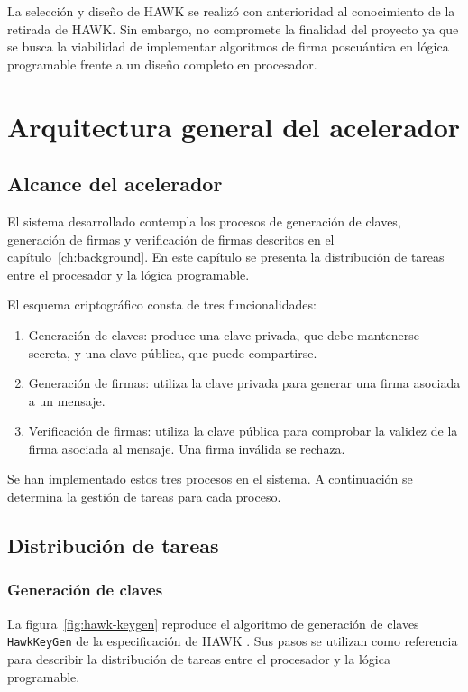 La selección y diseño de HAWK se realizó con anterioridad al conocimiento de la retirada de HAWK.
Sin embargo, no compromete la finalidad del proyecto ya que se busca la viabilidad de implementar
algoritmos de firma poscuántica en lógica programable frente a un diseño completo en procesador.

\section{Arquitectura general del acelerador}
\label{sec:arquitectura-acelerador}

\subsection{Alcance del acelerador}

El sistema desarrollado contempla los procesos de generación
de claves, generación de firmas y verificación de firmas
descritos en el capítulo~\ref{ch:background}.
En este capítulo se presenta la distribución de tareas
entre el procesador y la lógica programable.

El esquema criptográfico consta de tres funcionalidades:
\begin{enumerate}
    \item Generación de claves: produce una clave privada,
    que debe mantenerse secreta, y una clave pública, que puede compartirse.
    \item Generación de firmas: utiliza la clave privada
    para generar una firma asociada a un mensaje.
    \item Verificación de firmas: utiliza la clave pública
    para comprobar la validez de la firma asociada al mensaje.
    Una firma inválida se rechaza.
\end{enumerate}
Se han implementado estos tres procesos en el sistema.
A continuación se determina la gestión de tareas para cada proceso.

\subsection{Distribución de tareas}
\subsubsection{Generación de claves}

La figura~\ref{fig:hawk-keygen} reproduce el algoritmo de generación
de claves \texttt{HawkKeyGen} de la especificación de HAWK
\cite[p.~24, algoritmo~13]{hawk-spec-2025}. Sus pasos se utilizan
como referencia para describir la distribución de tareas entre
el procesador y la lógica programable.

